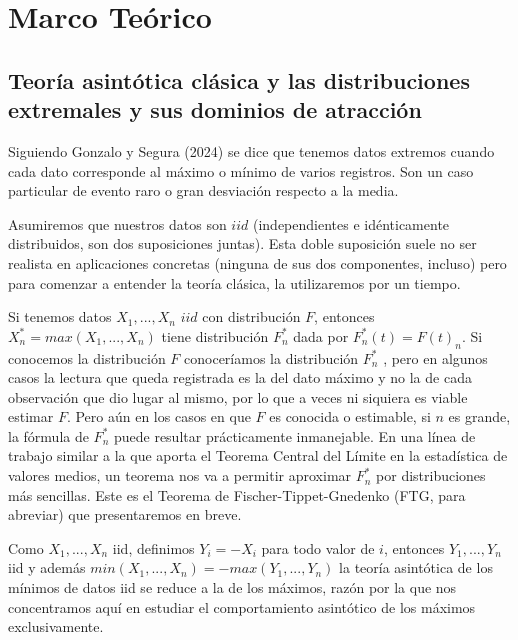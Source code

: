 \documentclass[
  12pt]{article}
\begin{document}
\hypertarget{marco-teuxf3rico}{%
\section{Marco Teórico}\label{marco-teuxf3rico}}

\hypertarget{teoruxeda-asintuxf3tica-cluxe1sica-y-las-distribuciones-extremales-y-sus-dominios-de-atracciuxf3n}{%
\subsection{Teoría asintótica clásica y las distribuciones extremales y
sus dominios de
atracción}\label{teoruxeda-asintuxf3tica-cluxe1sica-y-las-distribuciones-extremales-y-sus-dominios-de-atracciuxf3n}}

Siguiendo Gonzalo y Segura (2024) se dice que tenemos datos extremos
cuando cada dato corresponde al máximo o mínimo de varios registros. Son
un caso particular de evento raro o gran desviación respecto a la media.

Asumiremos que nuestros datos son \(iid\) (independientes e
idénticamente distribuidos, son dos suposiciones juntas). Esta doble
suposición suele no ser realista en aplicaciones concretas (ninguna de
sus dos componentes, incluso) pero para comenzar a entender la teoría
clásica, la utilizaremos por un tiempo.

Si tenemos datos \(X_1,...,X_n\) \(iid\) con distribución \(F\),
entonces \(X_n^* = max (X_1,...,X_n)\) tiene distribución \(F_n^*\) dada
por \(F_n^* (t)= F(t)_n\). Si conocemos la distribución \(F\)
conoceríamos la distribución \(F_n^*\) , pero en algunos casos la
lectura que queda registrada es la del dato máximo y no la de cada
observación que dio lugar al mismo, por lo que a veces ni siquiera es
viable estimar \(F\). Pero aún en los casos en que \(F\) es conocida o
estimable, si \(n\) es grande, la fórmula de \(F_n^*\) puede resultar
prácticamente inmanejable. En una línea de trabajo similar a la que
aporta el Teorema Central del Límite en la estadística de valores
medios, un teorema nos va a permitir aproximar \(F_n^*\) por
distribuciones más sencillas. Este es el Teorema de
Fischer-Tippet-Gnedenko (FTG, para abreviar) que presentaremos en breve.

Como \(X_1,...,X_n\) iid, definimos \(Y_i = -X_i\) para todo valor de
\(i\), entonces \(Y_1,...,Y_n\) iid y además
\(min(X_1,...,X_n) = - max(Y_1,...,Y_n)\) la teoría asintótica de los
mínimos de datos iid se reduce a la de los máximos, razón por la que nos
concentramos aquí en estudiar el comportamiento asintótico de los
máximos exclusivamente.
\end{document}
